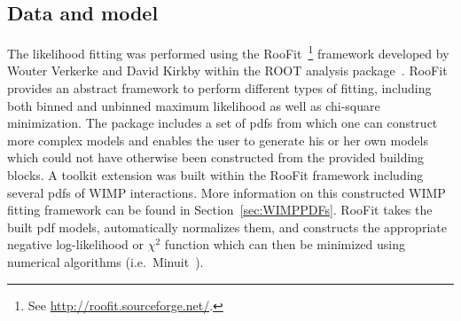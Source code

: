	\subsection{Data and model}
	\label{sec:LimitsDataAndModel}	

The likelihood fitting was performed using the RooFit~\footnote{See \url{http://roofit.sourceforge.net/}.} framework developed by Wouter Verkerke and David Kirkby within the ROOT analysis package~\cite{Bru97}.  RooFit provides an abstract framework to perform different types of fitting, including both binned and unbinned maximum likelihood as well as chi-square minimization.  The package includes a set of pdfs from which one can construct more complex models and enables the user to generate his or her own models which could not have otherwise been constructed from the provided building blocks.  A toolkit extension was built within the RooFit framework including several pdfs of WIMP interactions.  More information on this constructed WIMP fitting framework can be found in Section~\ref{sec:WIMPPDFs}.  RooFit takes the built pdf models, automatically normalizes them, and constructs the appropriate negative log-likelihood or $\chi^{2}$ function which can then be minimized using numerical algorithms (i.e.~Minuit~\cite{James:1975dr}).


